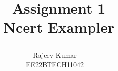 \documentclass[journal,12pt,onecolumn]{IEEEtran}
\theoremstyle{remark}
\begin{document}
%




\vspace{3cm}
\title{
\Huge\ Assignment 1\\
\Huge\ Ncert Exampler\\
\large\author{Rajeev Kumar \\EE22BTECH11042}                                                                      
}


%
%
%

% 
%



% 
\end{document}
